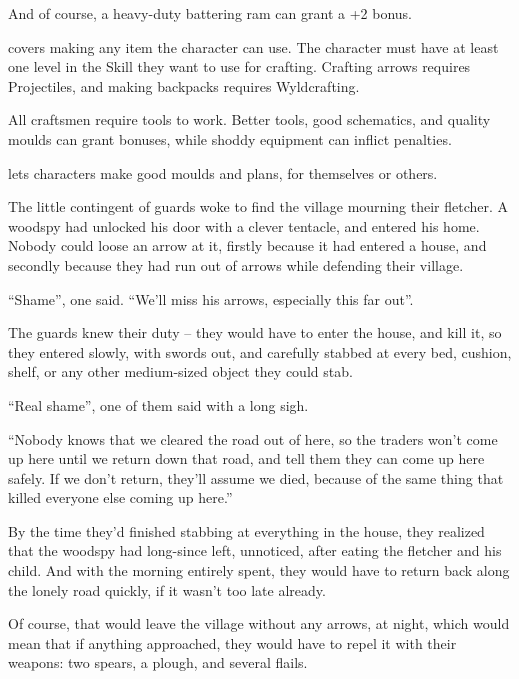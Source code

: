 \begin{multicols}{2}
\begin{description}
    And of course, a heavy-duty battering ram can grant a +2 bonus.
  \item[\roll{Dexterity}{Crafts}]
    covers making any item the character can use.
    The character must have at least one level in the Skill they want to use for crafting.
    Crafting arrows requires Projectiles, and making backpacks requires Wyldcrafting.

    All craftsmen require tools to work.
    Better tools, good schematics, and quality moulds can grant bonuses, while shoddy equipment can inflict penalties.
  \item[\roll{Intelligence}{Crafts}]
    lets characters make good moulds and plans, for themselves or others.
\end{description}

\begin{exampletext}
  The little contingent of \glspl{guard} woke to find the \gls{village} mourning their fletcher.
  A woodspy had unlocked his door with a clever tentacle, and entered his home.
  Nobody could loose an arrow at it, firstly because it had entered a house, and secondly because they had run out of arrows while defending their \gls{village}.

  ``Shame'', one said.
  ``We'll miss his arrows, especially this far out''.

  The \glspl{guard} knew their duty -- they would have to enter the house, and kill it, so they entered slowly, with swords out, and carefully stabbed at every bed, cushion, shelf, or any other medium-sized object they could stab.

  ``Real shame'', one of them said with a long sigh.

  ``Nobody knows that we cleared the road out of here, so the traders won't come up here until we return down that road, and tell them they can come up here safely.
  If we don't return, they'll assume we died, because of the same thing that killed everyone else coming up here.''

  By the time they'd finished stabbing at everything in the house, they realized that the woodspy had long-since left, unnoticed, after eating the fletcher and his child.
  And with the morning entirely spent, they would have to return back along the lonely road quickly, if it wasn't too late already.

  Of course, that would leave the \gls{village} without any arrows, at night, which would mean that if anything approached, they would have to repel it with their weapons: two spears, a plough, and several flails.


\end{exampletext}
\end{multicols}
